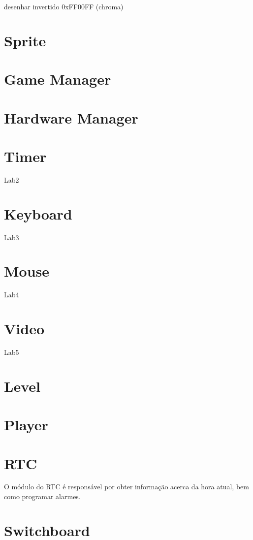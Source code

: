 \documentclass{report}
\begin{document}
desenhar invertido
0xFF00FF (chroma)

\section{Sprite}

\section{Game Manager}

\section{Hardware Manager}

\section{Timer}

Lab2

\section{Keyboard}

Lab3

\section{Mouse}

Lab4

\section{Video}

Lab5

\section{Level}

\section{Player}

\section{RTC}

O módulo do RTC é responsável por obter informação acerca da hora atual, bem como programar alarmes.

\section{Switchboard}
\end{document}
